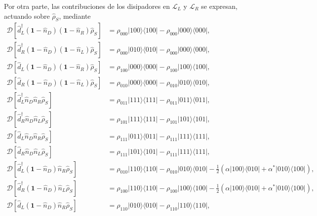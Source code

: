 \begin{appendixs}
Por otra parte, las contribuciones de los disipadores en $\mathcal{L}_{L}$ y $\mathcal{L}_{R}$ se expresan, actuando sobre $\hat{\rho}_{S}$, mediante
\begin{align*}
    \mathcal{D}[\hat{d}^{\dagger}_{L}(\textbf{1}-\hat{n}_{D})(\textbf{1}-\hat{n}_{R})\hat{\rho}_{S}] & = \rho_{000}|100\rangle \langle 100| - \rho_{000}|000\rangle \langle 000|, \\ 
    \mathcal{D}[\hat{d}^{\dagger}_{R}(\textbf{1}-\hat{n}_{D})(\textbf{1}-\hat{n}_{L})\hat{\rho}_{S}] & = \rho_{000}|010\rangle \langle 010| - \rho_{000}|000\rangle \langle 000|, \\  
    \mathcal{D}[\hat{d}_{L}(\textbf{1}-\hat{n}_{D})(\textbf{1}-\hat{n}_{R})\hat{\rho}_{S}] & = \rho_{100}|000\rangle \langle 000| - \rho_{100}|100\rangle \langle 100|, \\ 
    \mathcal{D}[\hat{d}_{R}(\textbf{1}-\hat{n}_{D})(\textbf{1}-\hat{n}_{L})\hat{\rho}_{S}] & = \rho_{010}|000\rangle \langle 000| - \rho_{010}|010\rangle \langle 010|, \\ 
    \mathcal{D}[\hat{d}^{\dagger}_{L}\hat{n}_{D} \hat{n}_{R}\hat{\rho}_{S}] & = \rho_{011}|111\rangle \langle 111| - \rho_{011}|011\rangle \langle 011|, \\  
    \mathcal{D}[\hat{d}^{\dagger}_{R} \hat{n}_{D}\hat{n}_{L}\hat{\rho}_{S}] & = \rho_{101}|111\rangle \langle 111| - \rho_{101}|101\rangle \langle 101|, \\ 
     \mathcal{D}[\hat{d}_{L}\hat{n}_{D}\hat{n}_{R}\hat{\rho}_{S}] & = \rho_{111}|011\rangle \langle 011| - \rho_{111}|111\rangle \langle 111|, \\    
      \mathcal{D}[\hat{d}_{R}\hat{n}_{D}\hat{n}_{L}\hat{\rho}_{S}] & = \rho_{111}|101\rangle \langle 101| - \rho_{111}|111\rangle \langle 111|, \\ 
    \mathcal{D}[\hat{d}^{\dagger}_{L}(\textbf{1}-\hat{n}_{D})\hat{n}_{R}\hat{\rho}_{S}] & = \rho_{010}|110\rangle \langle 110| - \rho_{010}|010\rangle \langle 010| - \frac{1}{2}( \alpha|100\rangle \langle 010| + \alpha^{*}|010\rangle \langle 100|), \\ 
    \mathcal{D}[\hat{d}^{\dagger}_{R}(\textbf{1}-\hat{n}_{D})\hat{n}_{L}\hat{\rho}_{S}] & = \rho_{100}|110\rangle \langle 110| - \rho_{100}|100\rangle \langle 100| - \frac{1}{2}( \alpha |100\rangle \langle 010| + \alpha^{*}|010\rangle \langle 100| ), \\  
    \mathcal{D}[\hat{d}_{L}(\textbf{1}-\hat{n}_{D})\hat{n}_{R}\hat{\rho}_{S}] & = \rho_{110}|010\rangle \langle 010| - \rho_{110}|110\rangle \langle 110|, \\ 

\end{align*}
\end{appendixs}
